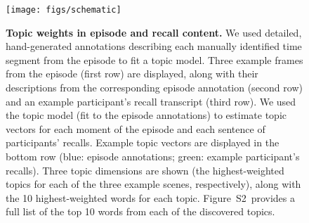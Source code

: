 \documentclass[10pt]{article}
\newcommand{\topics}{S2}
\begin{document}
\begin{figure}[tp]
\centering
\texttt{[image: figs/schematic]}
\caption{\small \textbf{Topic weights in episode and recall content.} We used detailed, hand-generated annotations describing each manually identified time segment from the episode to fit a topic model.  Three example frames from the episode (first row) are displayed, along with their descriptions from the corresponding episode annotation (second row) and an example participant's recall transcript (third row).  We used the topic model (fit to the episode annotations) to estimate topic vectors for each moment of the episode and each sentence of participants' recalls.  Example topic vectors are displayed in the bottom row (blue: episode annotations; green: example participant's recalls).  Three topic dimensions are shown (the highest-weighted topics for each of the three example scenes, respectively), along with the 10 highest-weighted words for each topic.  Figure~\topics~provides a full list of the top 10 words from each of the discovered topics.}
\label{fig:schematic}
\end{figure}
\end{document}
